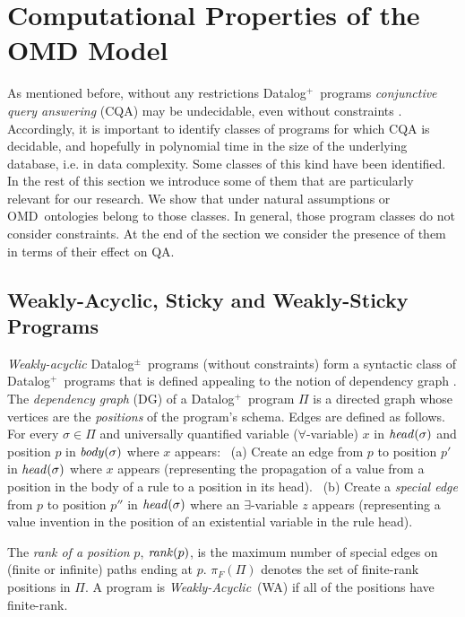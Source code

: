 \documentclass[format=acmsmall, review=false, screen=true]{acmart}
\newcommand{\nit}[1]{{\it #1}}
\newcommand{\dpm}{{Datalog}$^\pm$}
\newcommand{\prg}{\Pi}
\newcommand{\rank}{\pi}
\newcommand{\finiteRank}{\rank_F}
\newcommand{\dplus}{{Datalog}$^+$}
\newcommand{\omd}{OMD}
\newcommand{\red}[1]{{#1}}
\begin{document}
\section{Computational Properties of the OMD Model} \label{sec:complexity}



As mentioned before, without any restrictions \dplus \ programs {\em conjunctive query answering} (CQA) may be undecidable, even without constraints \cite{cali03}. Accordingly, it is important to identify classes of programs for which CQA is decidable, and hopefully in polynomial time in the size of the underlying database, i.e. in data complexity. Some classes of this kind have been identified. In the rest of this section we introduce some of them that are particularly relevant for our research. We show that under natural assumptions or \omd \ ontologies belong to those classes. In general, those program classes  do not consider constraints. At the end of the section we consider the presence of them in terms of their effect on QA.


\subsection{Weakly-Acyclic, Sticky and Weakly-Sticky Programs} \label{sec:wa}



{\em Weakly-acyclic}  \dpm \ programs (without constraints) form a syntactic class of \dplus \ programs that is defined appealing to the notion of dependency graph \cite{fagin}.
The {\em dependency graph} (DG) of a \dplus \ program $\prg$ is a directed graph whose vertices are the {\em positions} of the program's schema. Edges are defined as follows. For every $\sigma \in \prg$ and universally quantified variable ($\forall$-variable) $x$ in ${\it head}(\sigma)$ and  position $p$ in ${\it body}(\sigma)$ where $x$ appears: \ (a)  Create an edge from $p$ to position $p'$ in ${\it head}(\sigma)$ where $x$ appears \red{(representing the propagation of a value from a position in the body of a rule to a position in its head).} \ (b) Create a {\it special edge} from $p$ to position $p''$ in ${\it head}(\sigma)$ where an $\exists$-variable $z$ appears \red{(representing a value invention in the position of an  existential variable in the rule head)}.

The {\it rank of a position} $p$, $\nit{rank}(p)$, is the maximum number of special edges on (finite or infinite) paths ending at $p$. $\finiteRank(\prg)$ denotes the set of finite-rank positions in $\prg$. A program is {\em Weakly-Acyclic}~(WA) if all of the positions have finite-rank.
\end{document}

